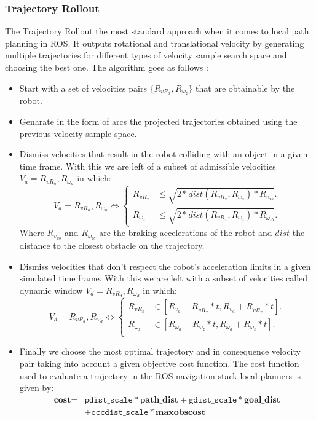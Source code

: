\subsubsection*{Trajectory Rollout}
The Trajectory Rollout  the most standard approach when it comes to local path planning in \ac{ROS}. It outputs  rotational and translational velocity by generating multiple trajectories for different types of velocity sample search space and choosing the best one. The algorithm goes as follows \cite{inbookdwa}:
\begin{itemize}
    \item Start with a set of velocities pairs $\{R_{vR_x},R_{ \omega_z} \}$ that are obtainable by the robot.
    \item Genarate in the form of arcs the projected trajectories obtained using the previous velocity sample space.
    \item Dismiss velocities that result in the robot colliding with an object in a given time frame. With this we are left of a subset of admissible velocities $V_a=R_{vR_a},R_{ \omega_a}$ in which:
    \begin{equation}
         V_a=R_{vR_a},R_{ \omega_a} \iff \begin{cases}
    R_{vR_x} & 	\leq \sqrt{2*dist(R_{vR_x},R_{ \omega_z})*R_{\dot{v}_{xb}}}.\\
    R_{ \omega_z}  &  	\leq \sqrt{2*dist(R_{vR_x},R_{ \omega_z})*R_{\dot{\omega}_{zb}}}.
  \end{cases}
    \end{equation}
    Where $R_{\dot{v}_{xb}}$ and $R_{\dot{\omega}_{zb}}$ are the braking accelerations of the robot and $dist$ the distance to the closest obstacle on the trajectory.
    
    
    \item Dismiss velocities that don't respect the robot's acceleration limits in a given simulated time frame. With this we are left with a subset of velocities called dynamic window $V_d=R_{vR_d},R_{ \omega_d}$  in which:
    \begin{equation}
         V_d=R_{vR_d},R_{ \omega_d} \iff \begin{cases}
    R_{vR_x} & 	\in [R_{v_a}-R_{\dot{vR}_{x}}*t,R_{v_a} + R_{\dot{vR}_{x}}*t].\\
    R_{\omega_z} & 	\in [R_{ \omega_a}-R_{\dot{\omega}_{z}}*t,R_{\omega_a}+R_{\dot{\omega}_{z}}*t].\\
  \end{cases}
    \end{equation}
    \item Finally we choose  the most optimal trajectory and in consequence velocity pair taking into account a given objective cost function.
    The cost function used to evaluate a trajectory in the \ac{ROS} navigation stack local planners is given by:
    \begin{align*}
            \textbf{cost} = &
       \texttt{pdist\_scale} * \textbf{path\_dist}
       + \texttt{gdist\_scale} * \textbf{goal\_dist}\\
       &+\texttt{occdist\_scale} * \textbf{maxobscost} 
    \end{align*}
    

\end{itemize}
